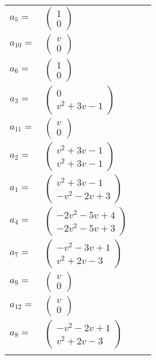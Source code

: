 \documentclass[1p]{elsarticle_modified}
\theoremstyle{definition}
\begin{document}
\begin{tabular}{m{7pt} m{180pt} m{7pt} m{180pt} }
\flushright $a_{5}=$&$\begin{pmatrix}1\\0\end{pmatrix}$ \\
\flushright $a_{10}=$&$\begin{pmatrix}v\\0\end{pmatrix}$ \\
\flushright $a_{6}=$&$\begin{pmatrix}1\\0\end{pmatrix}$ \\
\flushright $a_{3}=$&$\begin{pmatrix}0\\v^2+3 v-1\end{pmatrix}$ \\
\flushright $a_{11}=$&$\begin{pmatrix}v\\0\end{pmatrix}$ \\
\flushright $a_{2}=$&$\begin{pmatrix}v^2+3 v-1\\v^2+3 v-1\end{pmatrix}$ \\
\flushright $a_{1}=$&$\begin{pmatrix}v^2+3 v-1\\- v^2-2 v+3\end{pmatrix}$ \\
\flushright $a_{4}=$&$\begin{pmatrix}-2 v^2-5 v+4\\-2 v^2-5 v+3\end{pmatrix}$ \\
\flushright $a_{7}=$&$\begin{pmatrix}- v^2-3 v+1\\v^2+2 v-3\end{pmatrix}$ \\
\flushright $a_{9}=$&$\begin{pmatrix}v\\0\end{pmatrix}$ \\
\flushright $a_{12}=$&$\begin{pmatrix}v\\0\end{pmatrix}$ \\
\flushright $a_{8}=$&$\begin{pmatrix}- v^2-2 v+1\\v^2+2 v-3\end{pmatrix}$\\&\end{tabular}
\end{document}
